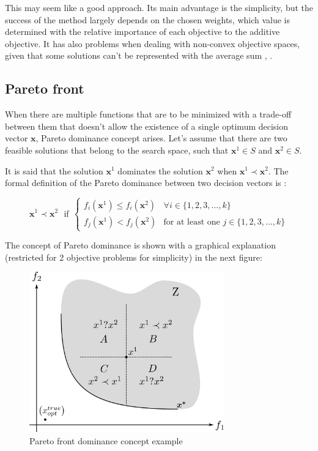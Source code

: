     
    This may seem like a good approach. Its main advantage is the simplicity, but the success of the method largely depends on the chosen weights, which value is determined with the relative importance of each objective to the additive objective. It has also problems when dealing with non-convex objective spaces, given that some solutions can't be represented with the average sum \cite{jakob2014pareto}, \cite{fonseca1995overview}.

\subsection{Pareto front}

    When there are multiple functions that are to be minimized with a trade-off between them that doesn't allow the existence of a single optimum decision vector $\bm{x}$, Pareto dominance concept arises. Let's assume that there are two feasible solutions that belong to the search space, such that $\bm{x}^1\in S$ and $\bm{x}^2\in S$. 
    
    \newpage
    
    It is said that the solution $\bm{x}^1$ dominates the solution $\bm{x}^2$ when $\bm{x}^1 \prec \bm{x}^2$. The formal definition of the Pareto dominance between two decision vectors is \cite{collette2013multiobjective}:
    
    \begin{equation}
        \bm{x}^1 \prec \bm{x}^2\ \ \ \textrm{if} \ \ \left\{
        \begin{array}{rl}
            f_i(\bm{x}^1) \leq f_i(\bm{x}^2)&  \forall i \in \{1,2,3,...,k\}\\
            f_j(\bm{x}^1) < f_j(\bm{x}^2) & \textrm{for at least one } j \in \{1,2,3,...,k\} 
        \end{array} \right.
        \label{eq:ParetoDominance}
    \end{equation}
    
    The concept of Pareto dominance is shown with a graphical explanation (restricted for 2 objective problems for simplicity) in the next figure:
    
    \begin{figure}[h!]
        \centering
        \includegraphics[width=0.75\textwidth]{Figures/2/paretoFront4cuad.png}
        \caption{Pareto front dominance concept example}
        \label{fig:4cuad}
    \end{figure}
    
